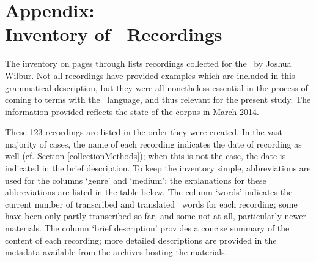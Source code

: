 %



\appendix%
\chapter*{Appendix: \\Inventory of \PS\ Recordings}
\label{inventory}\hypertarget{inventoryRef}{}
The inventory on pages \pageref{inventoryBegin} through \pageref{inventoryEnd} 
lists recordings collected for the \PSDP\ by Joshua Wilbur. Not all recordings have provided examples which are included in this grammatical description, but they were all nonetheless essential in the process of coming to terms with the \PS\ language, and thus relevant for the present study. 
The information provided reflects the state of the corpus in March 2014. 

These 123 recordings are listed in the order they were created. In the vast majority of cases, the name of each recording indicates the date of recording as well (cf. Section \ref{collectionMethods}); when this is not the case, the date is indicated in the brief description. To keep the inventory simple, %
abbreviations are used for the columns ‘genre’ and ‘medium’; %
the explanations for these abbreviations are listed in the table below. %
The column ‘words’ indicates the current number of transcribed and translated \PS\ words for each recording; some have been only partly transcribed so far, and some not at all, particularly newer materials. 
The column ‘brief description’ provides a concise summary of the content of each recording; more detailed descriptions are provided in the metadata available from the archives hosting the materials. 

